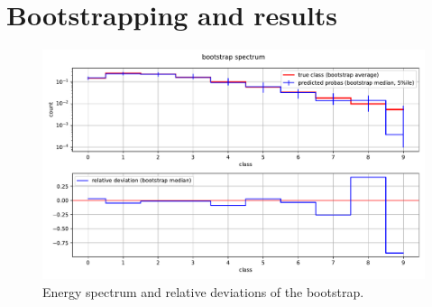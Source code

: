 \section{Bootstrapping and results}

\begin{figure}
    \centering
    \includegraphics[width=\textwidth]{content/plots/halftime/bootstrap_spectrum.pdf}
    \caption{Energy spectrum and relative deviations of the bootstrap.}
    \label{fig:bootstrap:spectrum}
\end{figure}

